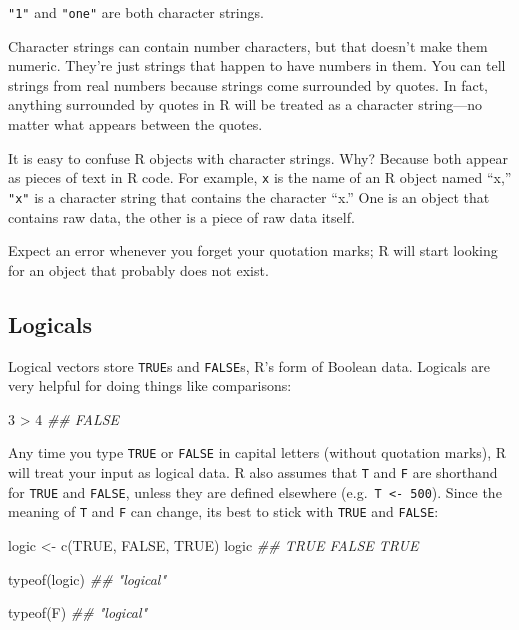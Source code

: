 \documentclass[
  letterpaper,
  DIV=11,
  numbers=noendperiod]{scrbook}
\newenvironment{Shaded}{\begin{snugshade}}{\end{snugshade}}
\newcommand{\ConstantTok}[1]{\textcolor[rgb]{0.56,0.35,0.01}{#1}}
\newcommand{\DecValTok}[1]{\textcolor[rgb]{0.68,0.00,0.00}{#1}}
\newcommand{\DocumentationTok}[1]{\textcolor[rgb]{0.37,0.37,0.37}{\textit{#1}}}
\newcommand{\FunctionTok}[1]{\textcolor[rgb]{0.28,0.35,0.67}{#1}}
\newcommand{\NormalTok}[1]{\textcolor[rgb]{0.00,0.23,0.31}{#1}}
\newcommand{\OtherTok}[1]{\textcolor[rgb]{0.00,0.23,0.31}{#1}}
\newcommand{\SpecialCharTok}[1]{\textcolor[rgb]{0.37,0.37,0.37}{#1}}
\begin{document}
\texttt{"1"} and \texttt{"one"} are both character strings.

Character strings can contain number characters, but that doesn't make
them numeric. They're just strings that happen to have numbers in them.
You can tell strings from real numbers because strings come surrounded
by quotes. In fact, anything surrounded by quotes in R will be treated
as a character string---no matter what appears between the quotes.

It is easy to confuse R objects with character strings. Why? Because
both appear as pieces of text in R code. For example, \texttt{x} is the
name of an R object named ``x,'' \texttt{"x"} is a character string that
contains the character ``x.'' One is an object that contains raw data,
the other is a piece of raw data itself.

Expect an error whenever you forget your quotation marks; R will start
looking for an object that probably does not exist.

\subsection{Logicals}\label{sec-logicals}

Logical vectors store \texttt{TRUE}s and \texttt{FALSE}s, R's form of
Boolean data. Logicals are very helpful for doing things like
comparisons:

\begin{Shaded}
\begin{Highlighting}[]
\DecValTok{3} \SpecialCharTok{\textgreater{}} \DecValTok{4}
\DocumentationTok{\#\# FALSE}
\end{Highlighting}
\end{Shaded}

Any time you type \texttt{TRUE} or \texttt{FALSE} in capital letters
(without quotation marks), R will treat your input as logical data. R
also assumes that \texttt{T} and \texttt{F} are shorthand for
\texttt{TRUE} and \texttt{FALSE}, unless they are defined elsewhere
(e.g.~\texttt{T\ \textless{}-\ 500}). Since the meaning of \texttt{T}
and \texttt{F} can change, its best to stick with \texttt{TRUE} and
\texttt{FALSE}:

\begin{Shaded}
\begin{Highlighting}[]
\NormalTok{logic }\OtherTok{\textless{}{-}} \FunctionTok{c}\NormalTok{(}\ConstantTok{TRUE}\NormalTok{, }\ConstantTok{FALSE}\NormalTok{, }\ConstantTok{TRUE}\NormalTok{)}
\NormalTok{logic}
\DocumentationTok{\#\#   TRUE FALSE  TRUE}

\FunctionTok{typeof}\NormalTok{(logic)}
\DocumentationTok{\#\# "logical"}

\FunctionTok{typeof}\NormalTok{(F)}
\DocumentationTok{\#\# "logical"}
\end{Highlighting}
\end{Shaded}
\end{document}
